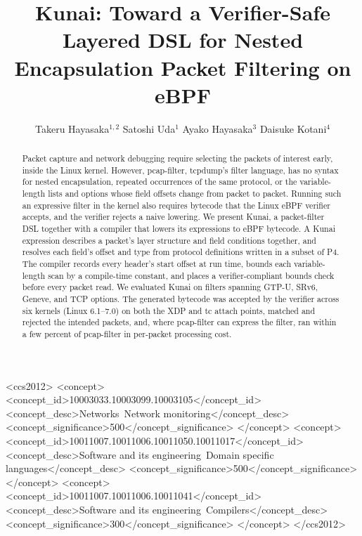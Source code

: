 \documentclass[sigplan,10pt]{acmart}
\newcommand{\kunai}{Kunai\xspace}
\begin{document}
\title{Kunai: Toward a Verifier-Safe Layered DSL for Nested Encapsulation Packet Filtering on eBPF}

\author{Takeru Hayasaka$^{1,2}$ \quad Satoshi Uda$^{1}$ \quad Ayako Hayasaka$^{3}$ \quad Daisuke Kotani$^{4}$}

\begin{abstract}
Packet capture and network debugging require selecting the packets
of interest early, inside the Linux kernel. However, pcap-filter,
tcpdump's filter language, has no syntax for nested
encapsulation, repeated occurrences of the same protocol, or the
variable-length lists and options whose field offsets change from
packet to packet. Running such an expressive filter in the kernel
also requires bytecode that the Linux eBPF verifier accepts, and the
verifier rejects a naive lowering. We present \kunai, a packet-filter DSL
together with a compiler that lowers its expressions to eBPF
bytecode. A \kunai expression describes a packet's layer structure
and field conditions together, and resolves each field's offset and
type from protocol definitions written in a subset of P4. The
compiler records every header's start offset at run time, bounds each
variable-length scan by a compile-time constant, and places a
verifier-compliant bounds check before every packet read. We
evaluated \kunai on filters spanning GTP-U, SRv6, Geneve, and TCP
options. The generated bytecode was accepted by the verifier across
six kernels (Linux 6.1--7.0) on both the XDP and tc attach points,
matched and rejected the intended packets, and, where pcap-filter can
express the filter, ran within a few percent of pcap-filter in
per-packet processing cost.
\end{abstract}

\begin{CCSXML}
<ccs2012>
   <concept>
       <concept_id>10003033.10003099.10003105</concept_id>
       <concept_desc>Networks~Network monitoring</concept_desc>
       <concept_significance>500</concept_significance>
       </concept>
   <concept>
       <concept_id>10011007.10011006.10011050.10011017</concept_id>
       <concept_desc>Software and its engineering~Domain specific languages</concept_desc>
       <concept_significance>500</concept_significance>
       </concept>
   <concept>
       <concept_id>10011007.10011006.10011041</concept_id>
       <concept_desc>Software and its engineering~Compilers</concept_desc>
       <concept_significance>300</concept_significance>
       </concept>
 </ccs2012>
\end{CCSXML}
\end{document}
